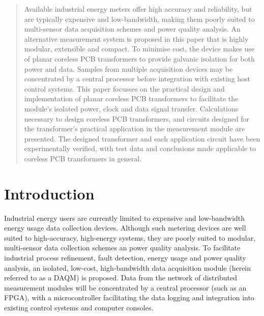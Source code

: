\documentclass[conference]{IEEEtran}
\begin{document}
\begin{abstract}
Available industrial energy meters offer high accuracy and reliability, but are typically expensive and low-bandwidth, making them poorly suited to multi-sensor data acquisition schemes and power quality analysis.  An alternative measurement system is proposed in this paper that is highly modular, extensible and compact.  To minimise cost, the device makes use of planar coreless PCB transformers to provide galvanic isolation for both power and data. Samples from multiple acquisition devices may be concentrated by a central processor before integration with existing host control systems. This paper focusses on the practical design and implementation of planar coreless PCB transformers to facilitate the module's isolated power, clock and data signal transfer.  Calculations necessary to design coreless PCB transformers, and circuits designed for the transformer's practical application in the measurement module are presented.  The designed transformer and each application circuit have been experimentally verified, with test data and conclusions made applicable to coreless PCB transformers in general.
\end{abstract}


\IEEEpeerreviewmaketitle

\section{Introduction}
Industrial energy users are currently limited to expensive and low-bandwidth energy usage data collection devices. Although such metering devices are well suited to high-accuracy, high-energy systems, they are poorly suited to modular, multi-sensor data collection schemes an power quality analysis.  To facilitate industrial process refinement, fault detection, energy usage and power quality analysis, an isolated, low-cost, high-bandwidth data acquisition module (herein referred to as a DAQM) is proposed.  Data from the network of distributed measurement modules will be concentrated by a central processor (such as an FPGA), with a microcontroller facilitating the data logging and integration into existing control systems and computer consoles.
\end{document}
